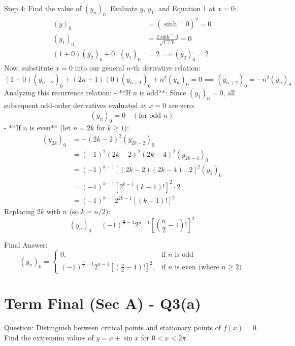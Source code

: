 \documentclass{article}
\begin{document}
Step 4: Find the value of $(y_n)_0$.
Evaluate $y$, $y_1$, and Equation 1 at $x = 0$:
\begin{align*}
    (y)_0 &= (\sinh^{-1} 0)^2 = 0 \\
    (y_1)_0 &= \frac{2\sinh^{-1} 0}{\sqrt{1+0}} = 0 \\
    (1+0)(y_2)_0 + 0 \cdot (y_1)_0 &= 2 \implies (y_2)_0 = 2
\end{align*}
Now, substitute $x = 0$ into our general $n$-th derivative relation:
\[
(1+0)(y_{n+2})_0 + (2n+1)(0)(y_{n+1})_0 + n^2(y_n)_0 = 0 \implies (y_{n+2})_0 = -n^2 (y_n)_0
\]
Analyzing this recurrence relation:
- **If $n$ is odd**:
  Since $(y_1)_0 = 0$, all subsequent odd-order derivatives evaluated at $x = 0$ are zero:
  \[
  (y_n)_0 = 0 \quad (\text{for odd } n)
  \]
- **If $n$ is even** (let $n = 2k$ for $k \ge 1$):
  \begin{align*}
      (y_{2k})_0 &= -(2k-2)^2 (y_{2k-2})_0 \\
      &= (-1)^2 (2k-2)^2 (2k-4)^2 (y_{2k-4})_0 \\
      &= (-1)^{k-1} \left[ (2k-2)(2k-4)\dots 2 \right]^2 (y_2)_0 \\
      &= (-1)^{k-1} \left[ 2^{k-1} (k-1)! \right]^2 \cdot 2 \\
      &= (-1)^{k-1} 2^{2k-1} \left[ (k-1)! \right]^2
  \end{align*}
  Replacing $2k$ with $n$ (so $k = n/2$):
  \[
  (y_n)_0 = (-1)^{\frac{n}{2}-1} 2^{n-1} \left[ \left(\frac{n}{2}-1\right)! \right]^2
  \]

Final Answer:
\[
\boxed{
(y_n)_0 = \begin{cases} 
0, & \text{if } n \text{ is odd} \\ 
(-1)^{\frac{n}{2}-1} 2^{n-1} \left[ \left(\frac{n}{2}-1\right)! \right]^2, & \text{if } n \text{ is even (where } n \ge 2)
\end{cases}
}
\]

\section*{Term Final (Sec A) - Q3(a)}
Question:
Distinguish between critical points and stationary points of $f(x) = 0$. Find the extremum values of $y = x + \sin x$ for $0 < x < 2\pi$.
\end{document}
